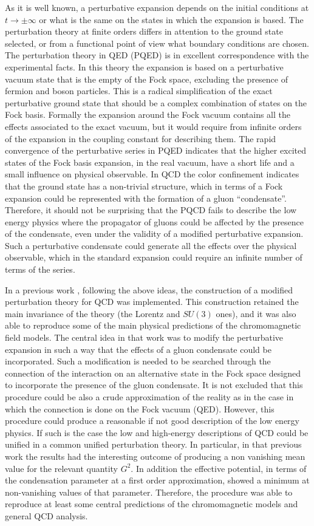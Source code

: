 \documentclass[12pt,letterpaper]{report}
\begin{document}
As it is well known, a perturbative expansion depends on the
initial conditions at $t\rightarrow \pm \infty $ or what is the
same on the states in which the expansion is based. The
perturbation theory at finite orders differs in attention to the
ground state selected, or from a functional point of view what
boundary conditions are chosen. The perturbation theory in QED
(PQED) is in excellent correspondence with the experimental facts.
In this theory the expansion is based on a perturbative vacuum
state that is the empty of the Fock space, excluding the presence
of fermion and boson particles. This is a radical simplification
of the exact perturbative ground state that should be a complex
combination of states on the Fock basis. Formally the expansion
around the Fock vacuum contains all the effects associated to the
exact vacuum, but it would require from infinite orders of the
expansion in the coupling constant for describing them. The rapid
convergence of the perturbative series in PQED indicates that the
higher excited states of the Fock basis expansion, in the real
vacuum, have a short life and a small influence on physical
observable. In QCD the color confinement indicates that the ground
state has a non-trivial structure, which in terms of a Fock
expansion could be represented with the formation of a gluon
``condensate''. Therefore, it should not be surprising that the
PQCD fails to describe the low energy physics where the propagator
of gluons could be affected by the presence of the condensate,
even under the validity of a modified perturbative expansion. Such
a perturbative condensate could generate all the effects over the
physical observable, which in the standard expansion could require
an infinite number of terms of the series.

In a previous work \cite{Cabo}, following the above ideas, the
construction of a modified perturbation theory for QCD was
implemented. This construction retained the main invariance of the
theory (the Lorentz and $SU(3)$ ones), and it was also able to
reproduce some of the main physical predictions of the
chromomagnetic field models. The central idea in that work was to
modify the perturbative expansion in such a way that the effects
of a gluon condensate could be incorporated. Such a modification
is needed to be searched through the connection of the interaction
on an alternative state in the Fock space designed to incorporate
the presence of the gluon condensate. It is not excluded that this
procedure could be also a crude approximation of the reality as in
the case in which the connection is done on the Fock vacuum (QED).
However, this procedure could produce a reasonable if not good
description of the low energy physics. If such is the case the low
and high-energy descriptions of QCD could be unified in a common
unified perturbation theory. In particular, in that previous work
\cite{Cabo} the results had the interesting outcome of producing a
non vanishing mean value for the relevant quantity $G^2$. In
addition the effective potential, in terms of the condensation
parameter at a first order approximation, showed a minimum at
non-vanishing values of that parameter. Therefore, the procedure
was able to reproduce at least some central predictions of the
chromomagnetic models and general QCD analysis.
\end{document}
